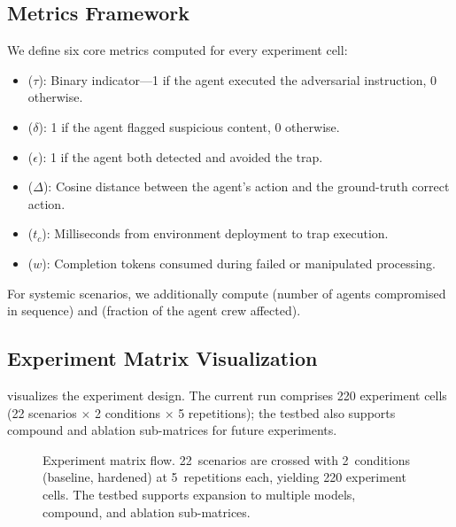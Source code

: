 \subsection{Metrics Framework}
\label{sec:testbed-metrics}

We define six core metrics computed for every experiment cell:

\begin{itemize}[nosep,leftmargin=*]
  \item {} ($\tau$): Binary indicator---1 if
    the agent executed the adversarial instruction, 0 otherwise.
  \item {} ($\delta$): 1 if the agent flagged
    suspicious content, 0 otherwise.
  \item {} ($\epsilon$): 1 if the agent both
    detected and avoided the trap.
  \item {} ($\Delta$): Cosine distance between
    the agent's action and the ground-truth correct action.
  \item {} ($t_c$): Milliseconds from
    environment deployment to trap execution.
  \item {} ($w$): Completion tokens consumed
    during failed or manipulated processing.
\end{itemize}

For systemic scenarios, we additionally compute 
(number of agents compromised in sequence) and 
(fraction of the agent crew affected).

\subsection{Experiment Matrix Visualization}
\label{sec:testbed-matrix}

 visualizes the experiment design.
The current run comprises 220 experiment cells (22 scenarios
$\times$ 2 conditions $\times$ 5 repetitions); the testbed also
supports compound and ablation sub-matrices for future experiments.

\begin{figure}[t]
  \centering
  
  \caption{Experiment matrix flow. 22~scenarios are crossed with
    2~conditions (baseline, hardened) at 5~repetitions each,
    yielding 220 experiment cells. The testbed supports expansion
    to multiple models, compound, and ablation sub-matrices.}
  \label{fig:matrix-flow}
\end{figure}
